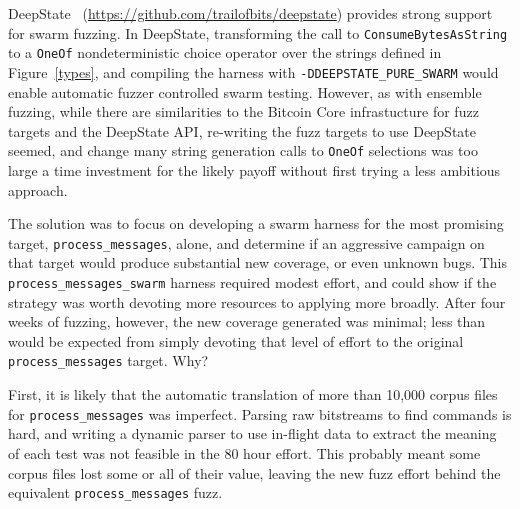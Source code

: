 \begin{sloppypar}
DeepState~\cite{goodman2018deepstate} (\url{https://github.com/trailofbits/deepstate}) provides strong support for swarm fuzzing.  In DeepState, transforming the call to {\tt ConsumeBytesAsString} to a {\tt OneOf} nondeterministic choice operator over the strings defined in Figure~\ref{types}, and compiling the harness with {\tt -DDEEPSTATE\_PURE\_SWARM} would enable automatic fuzzer controlled swarm testing. However, as with ensemble fuzzing, while there are similarities to the Bitcoin Core infrastucture for fuzz targets and the DeepState API, re-writing the fuzz targets to use DeepState seemed, and change many string generation calls to {\tt OneOf} selections was too large a time investment for the likely payoff without first trying a less ambitious approach.

The solution was to focus on developing a swarm harness for the most promising target, {\tt process\_messages}, alone, and determine if an aggressive campaign on that target would produce substantial new coverage, or even unknown bugs. This {\tt process\_messages\_swarm} harness required modest effort, and could show if the strategy was worth devoting more resources to applying more broadly.  After four weeks of fuzzing, however, the new coverage generated was minimal; less than would be expected from simply devoting that level of effort to the original {\tt process\_messages} target.  Why?

First, it is likely that the automatic translation of more than 10,000 corpus files for {\tt process\_messages} was imperfect.  Parsing raw bitstreams to find commands is hard, and writing a dynamic parser to use in-flight data to extract the meaning of each test was not feasible in the 80 hour effort.  This probably meant some corpus files lost some or all of their value, leaving the new fuzz effort behind the equivalent {\tt process\_messages} fuzz.


\end{sloppypar}
